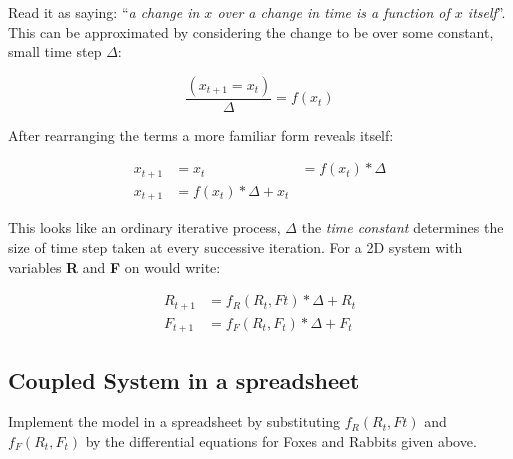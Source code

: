 \documentclass[]{book}
\begin{document}
Read it as saying: ``\emph{a change in \(x\) over a change in time is a
function of \(x\) itself}''. This can be approximated by considering the
change to be over some constant, small time step \(\Delta\):

\begin{equation}
\frac{(x_{t+1} = x_t)}{\Delta} = f(x_t)
\label{eq:Euler}
\end{equation}

After rearranging the terms a more familiar form reveals itself:

\begin{align}
x_{t+1} &= x_t &= f(x_t) * \Delta \\
x_{t+1} &= f(x_t) * \Delta + x_t
\label{eq:Euler2}
\end{align}

This looks like an ordinary iterative process, \(\Delta\) the \emph{time
constant} determines the size of time step taken at every successive
iteration. For a 2D system with variables \textbf{R} and \textbf{F} on
would write:

\begin{align}
R_{t+1} &= f_R(R_t,Ft) * \Delta + R_t \\
F_{t+1} &= f_F(R_t,F_t) * \Delta + F_t
\label{eq:EulerRF}
\end{align}

\subsection{Coupled System in a
spreadsheet}\label{coupled-system-in-a-spreadsheet}

Implement the model in a spreadsheet by substituting \(f_R(R_t,Ft)\) and
\(f_F(R_t,F_t)\) by the differential equations for Foxes and Rabbits
given above.
\end{document}
